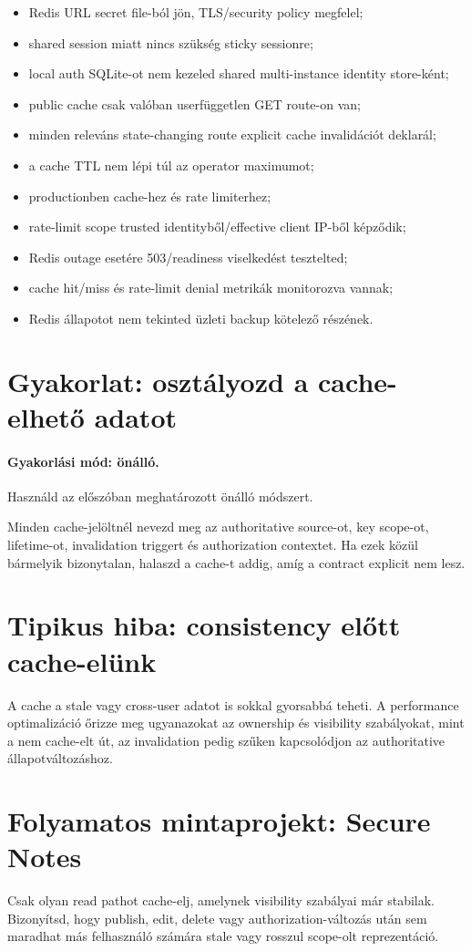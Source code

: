 \begin{itemize}
  \item Redis URL secret file-ból jön, TLS/security policy megfelel;
  \item shared session miatt nincs szükség sticky sessionre;
  \item local auth SQLite-ot nem kezeled shared multi-instance identity store-ként;
  \item public cache csak valóban userfüggetlen GET route-on van;
  \item minden releváns state-changing route explicit cache invalidációt deklarál;
  \item a cache TTL nem lépi túl az operator maximumot;
  \item productionben  cache-hez és rate limiterhez;
  \item rate-limit scope trusted identityből/effective client IP-ből képződik;
  \item Redis outage esetére 503/readiness viselkedést tesztelted;
  \item cache hit/miss és rate-limit denial metrikák monitorozva vannak;
  \item Redis állapotot nem tekinted üzleti backup kötelező részének.
\end{itemize}

\section{Gyakorlat: osztályozd a cache-elhető adatot}
\paragraph{Gyakorlási mód: önálló.} Használd az előszóban meghatározott önálló módszert.

Minden cache-jelöltnél nevezd meg az authoritative source-ot, key scope-ot, lifetime-ot, invalidation triggert és authorization contextet. Ha ezek közül bármelyik bizonytalan, halaszd a cache-t addig, amíg a contract explicit nem lesz.

\section{Tipikus hiba: consistency előtt cache-elünk}
A cache a stale vagy cross-user adatot is sokkal gyorsabbá teheti. A performance optimalizáció őrizze meg ugyanazokat az ownership és visibility szabályokat, mint a nem cache-elt út, az invalidation pedig szűken kapcsolódjon az authoritative állapotváltozáshoz.

\section{Folyamatos mintaprojekt: Secure Notes}
Csak olyan read pathot cache-elj, amelynek visibility szabályai már stabilak. Bizonyítsd, hogy publish, edit, delete vagy authorization-változás után sem maradhat más felhasználó számára stale vagy rosszul scope-olt reprezentáció.
